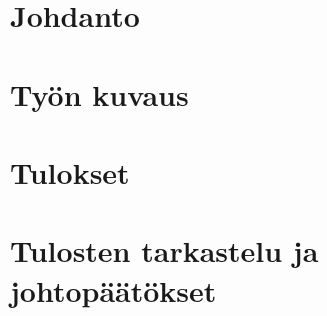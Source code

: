 \documentclass[11pt]{article}
\begin{document}
\onehalfspacing
{\let\bfseries\mdseries%
\renewcommand*\contentsname{Sisällysluettelo}
\tableofcontents}
{\fontsize{11}{10}\selectfont
\onehalfspacing
\justifying


\newpage
{}
\section{Johdanto}



\newpage
\section{Työn kuvaus}

\clearpage


\newpage
\section{Tulokset}

\clearpage


\newpage
\section{Tulosten tarkastelu ja johtopäätökset}





\newpage
\clearpage
{}
{}
\renewcommand*\refname{Lähdeluettelo}

\printbibliography
}



\newpage
{}

{}


\newpage


\end{document}
